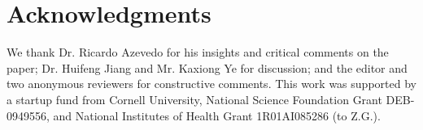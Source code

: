 \section{Acknowledgments}

We thank Dr. Ricardo Azevedo for his insights and critical comments on
the paper; Dr. Huifeng Jiang and Mr. Kaxiong Ye for discussion; and
the editor and two anonymous reviewers for constructive comments. This
work was supported by a startup fund from Cornell University, National
Science Foundation Grant DEB-0949556, and National Institutes of
Health Grant 1R01AI085286 (to Z.G.).